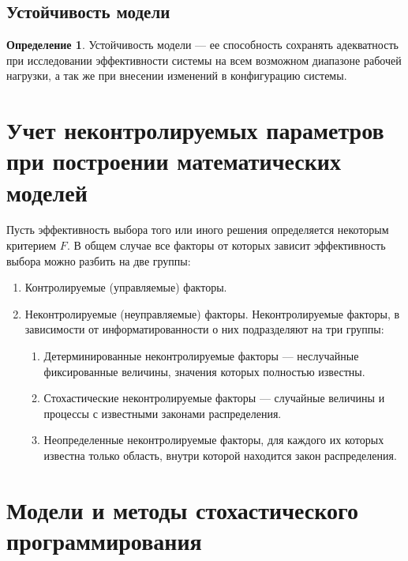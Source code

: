 \documentclass[12pt]{report}
\theoremstyle{definition}
\newtheorem{definition}[theorem]{Определение}
\begin{document}
\subsection{Устойчивость модели}

\begin{definition}
Устойчивость модели --- ее способность сохранять адекватность при
исследовании эффективности системы на всем возможном диапазоне рабочей нагрузки,
а так же при внесении изменений в конфигурацию системы.
\end{definition}


\section{Учет неконтролируемых параметров при построении математических моделей}

Пусть эффективность выбора того или иного решения определяется некоторым
критерием $F$. В общем случае все факторы от которых зависит эффективность
выбора можно разбить на две группы:
\begin{enumerate}
\item Контролируемые (управляемые) факторы.
\item Неконтролируемые (неуправляемые) факторы.
Неконтролируемые факторы, в зависимости от информатированности о них
подразделяют на три группы:
  \begin{enumerate}
  \item Детерминированные неконтролируемые факторы --- неслучайные
    фиксированные величины, значения которых полностью известны.
  \item Стохастические неконтролируемые факторы --- случайные величины и процессы
    с известными законами распределения.
  \item Неопределенные неконтролируемые факторы, для каждого их которых
    известна только область, внутри которой находится закон распределения.
  \end{enumerate}
\end{enumerate}


\section{Модели и методы стохастического программирования}
\end{document}
